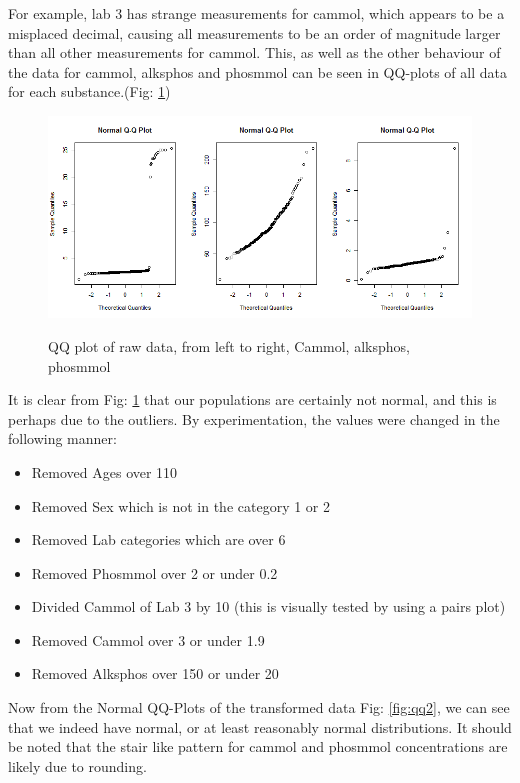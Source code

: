 \documentclass{article}
\begin{document}
           For example, lab 3 has strange measurements for cammol, which appears to be a misplaced decimal, causing all measurements to be an order of magnitude larger than all other measurements for cammol. This, as well as the other behaviour of the data for cammol, alksphos and phosmmol can be seen in QQ-plots of all data for each substance.(Fig: \ref{fig:qq1}) 
      \begin{figure}
		\centering
		{\includegraphics[scale=0.3]{../results/dat1_qq.png}}
		\caption{QQ plot of raw data, from left to right, Cammol, alksphos, phosmmol}
		\label{fig:qq1}
	\end{figure}

It is clear from Fig: \ref{fig:qq1} that our populations are certainly not normal, and this is perhaps due to the outliers. By experimentation, the values were changed in the following manner:
      \begin{itemize}
        \item Removed Ages over 110
        \item Removed Sex which is not in the category 1 or 2
        \item Removed Lab categories which are over 6
        \item Removed Phosmmol over 2 or under 0.2
        \item Divided Cammol of Lab 3 by 10 (this is visually tested by using a pairs plot)
        \item Removed Cammol over 3 or under 1.9
        \item Removed Alksphos over 150 or under 20
      \end{itemize}

Now from the Normal QQ-Plots of the transformed data Fig: \ref{fig:qq2}, we can see that we indeed have normal, or at least reasonably normal distributions. It should be noted that the stair like pattern for cammol and phosmmol concentrations are likely due to rounding.
\end{document}
